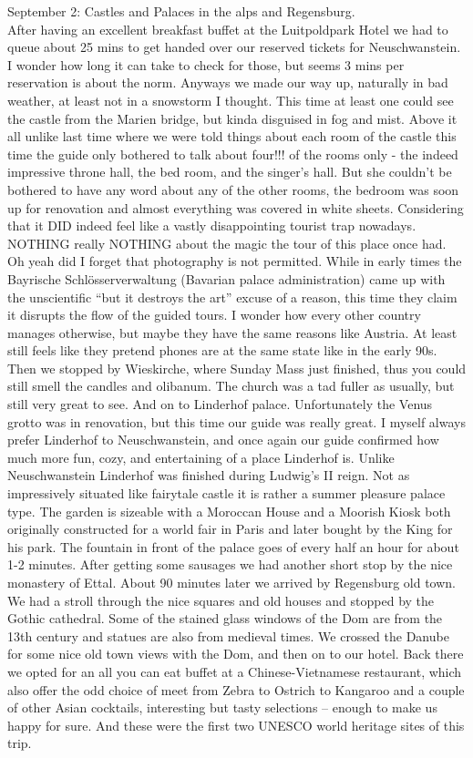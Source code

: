 September 2: Castles and Palaces in the alps and Regensburg.\\
After having an excellent breakfast buffet at the Luitpoldpark Hotel we had to queue about 25 mins to get handed over our reserved tickets for Neuschwanstein. I wonder how long it can take to check for those, but seems 3 mins per reservation is about the norm. Anyways we made our way up, naturally in bad weather, at least not in a snowstorm I thought. This time at least one could see the castle from the Marien bridge, but kinda disguised in fog and mist. Above it all unlike last time where we were told things about each room of the castle this time the guide only bothered to talk about four!!! of the rooms only - the indeed impressive throne hall, the bed room, and the singer's hall. But she couldn't be bothered to have any word about any of the other rooms, the bedroom was soon up for renovation and almost everything was covered in white sheets. Considering that it DID indeed feel like a vastly disappointing tourist trap nowadays. NOTHING really NOTHING about the magic the tour of this place once had. Oh yeah did I forget that photography is not permitted. While in early times the Bayrische Schl\"osserverwaltung (Bavarian palace administration) came up with the unscientific ``but it destroys the art'' excuse of a reason, this time they claim it disrupts the flow of the guided tours. I wonder how every other country manages otherwise, but maybe they have the same reasons like Austria. At least still feels like they pretend phones are at the same state like in the early 90s. Then we stopped by Wieskirche, where Sunday Mass just finished, thus you could still smell the candles and olibanum. The church was a tad fuller as usually, but still very great to see. And on to Linderhof palace. Unfortunately the Venus grotto was in renovation, but this time our guide was really great. I myself always prefer Linderhof to Neuschwanstein, and once again our guide confirmed how much more fun, cozy, and entertaining of a place Linderhof is. Unlike Neuschwanstein Linderhof was finished during Ludwig's II reign. Not as impressively situated like fairytale castle it is rather a summer pleasure palace type. The garden is sizeable with a Moroccan House and a Moorish Kiosk both originally constructed for a world fair in Paris and later bought by the King for his park. The fountain in front of the palace goes of every half an hour for about 1-2 minutes. After getting some sausages we had another short stop by the nice monastery of Ettal. About 90 minutes later we arrived by Regensburg old town. We had a stroll through the nice squares and old houses and stopped by the Gothic cathedral. Some of the stained glass windows of the Dom are from the 13th century and statues are also from medieval times. We crossed the Danube for some nice old town views with the Dom, and then on to our hotel. Back there we opted for an all you can eat buffet at a Chinese-Vietnamese restaurant, which also offer the odd choice of meet from Zebra to Ostrich to Kangaroo and a couple of other Asian cocktails, interesting but tasty selections -- enough to make us happy for sure. And these were the first two UNESCO world heritage sites of this trip.\\

